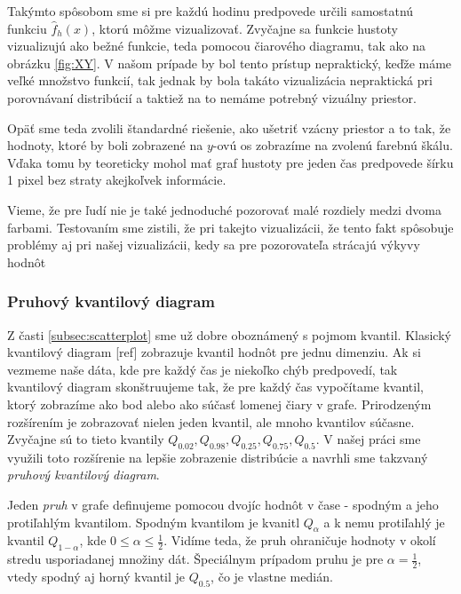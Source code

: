 Takýmto spôsobom sme si pre každú hodinu predpovede určili samostatnú funkciu $ \hat{f}_{h}(x) $, ktorú môžme vizualizovať. Zvyčajne sa funkcie hustoty vizualizujú ako bežné funkcie, teda pomocou čiarového diagramu, tak ako na obrázku \ref{fig:XY}. V našom prípade by bol tento prístup nepraktický, keďže máme veľké množstvo funkcií, tak jednak by bola takáto vizualizácia nepraktická pri porovnávaní distribúcií a taktiež na to nemáme potrebný vizuálny priestor.

Opäť sme teda zvolili štandardné riešenie, ako ušetriť vzácny priestor a to tak, že hodnoty, ktoré by boli zobrazené na $ y $-ovú os zobrazíme na zvolenú farebnú škálu. Vďaka tomu by teoreticky mohol mať graf hustoty pre jeden čas predpovede šírku 1 pixel bez straty akejkoľvek informácie.

Vieme, že pre ľudí nie je také jednoduché pozorovať malé rozdiely medzi dvoma farbami. Testovaním sme zistili, že pri takejto vizualizácii, že tento fakt spôsobuje problémy aj pri našej vizualizácii, kedy sa pre pozorovateľa strácajú výkyvy hodnôt



\subsubsection{Pruhový kvantilový diagram} 
Z časti \ref{subsec:scatterplot} sme už dobre oboznámený s pojmom kvantil. Klasický kvantilový diagram [ref] zobrazuje kvantil hodnôt pre jednu dimenziu. Ak si vezmeme naše dáta, kde pre každý čas je niekoľko chýb predpovedí, tak kvantilový diagram skonštruujeme tak, že pre každý čas vypočítame kvantil, ktorý zobrazíme ako bod alebo ako súčasť lomenej čiary v grafe.
Prirodzeným rozšírením je zobrazovať nielen jeden kvantil, ale mnoho kvantilov súčasne. Zvyčajne sú to tieto kvantily $ Q_{0.02}, Q_{0.98}, Q_{0.25}, Q_{0.75}, Q_{0.5} $. V našej práci sme využili toto rozšírenie na lepšie zobrazenie distribúcie a navrhli sme takzvaný \textit{pruhový kvantilový diagram}.

Jeden \textit{pruh} v grafe definujeme pomocou dvojíc hodnôt v čase - spodným a jeho protiľahlým kvantilom. Spodným kvantilom je kvanitl $ Q_{\alpha} $ a k nemu protiľahlý je kvantil $ Q_{1 - \alpha} $, kde $ 0 \leq \alpha \leq \frac{1}{2} $. Vidíme teda, že pruh ohraničuje hodnoty v okolí stredu usporiadanej množiny dát. Špeciálnym prípadom pruhu je pre $ \alpha = \frac{1}{2} $, vtedy spodný aj horný kvantil je $ Q_{0.5} $, čo je vlastne medián.

